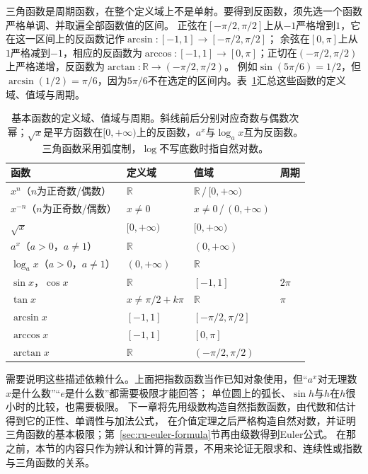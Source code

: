 三角函数是周期函数，在整个定义域上不是单射。要得到反函数，须先选一个函数严格单调、并取遍全部函数值的区间。
正弦在$[-\pi/2,\pi/2]$上从$-1$严格增到$1$，它在这一区间上的反函数记作$\arcsin:[-1,1]\to[-\pi/2,\pi/2]$；
余弦在$[0,\pi]$上从$1$严格减到$-1$，相应的反函数为$\arccos:[-1,1]\to[0,\pi]$；正切在$(-\pi/2,\pi/2)$上严格递增，反函数为$\arctan:\mathbb R\to(-\pi/2,\pi/2)$。
例如$\sin(5\pi/6)=1/2$，但$\arcsin(1/2)=\pi/6$，因为$5\pi/6$不在选定的区间内。表~\ref{tab:ru-elementary-functions}汇总这些函数的定义域、值域与周期。

\begin{table}[htbp]
 \centering\small
 \begin{tabular}{@{}llll@{}}
 \toprule
 函数 & 定义域 & 值域 & 周期\\
 \midrule
 $x^n$（$n$为正奇数/偶数） & $\mathbb R$ & $\mathbb R$\,/\,$[0,+\infty)$ & \\
 $x^{-n}$（$n$为正奇数/偶数） & $x\neq0$ & $x\neq0$\,/\,$(0,+\infty)$ & \\
 $\sqrt x$ & $[0,+\infty)$ & $[0,+\infty)$ & \\
 $a^x$（$a>0$，$a\neq1$） & $\mathbb R$ & $(0,+\infty)$ & \\
 $\log_ax$（$a>0$，$a\neq1$） & $(0,+\infty)$ & $\mathbb R$ & \\
 $\sin x$，$\cos x$ & $\mathbb R$ & $[-1,1]$ & $2\pi$\\
 $\tan x$ & $x\neq\pi/2+k\pi$ & $\mathbb R$ & $\pi$\\
 $\arcsin x$ & $[-1,1]$ & $[-\pi/2,\pi/2]$ & \\
 $\arccos x$ & $[-1,1]$ & $[0,\pi]$ & \\
 $\arctan x$ & $\mathbb R$ & $(-\pi/2,\pi/2)$ & \\
 \bottomrule
 \end{tabular}
 \caption{基本函数的定义域、值域与周期。斜线前后分别对应奇数与偶数次幂；$\sqrt x$是平方函数在$[0,+\infty)$上的反函数，$a^x$与$\log_ax$互为反函数。三角函数采用弧度制，$\log$不写底数时指自然对数。}
 \label{tab:ru-elementary-functions}
\end{table}

需要说明这些描述依赖什么。上面把指数函数当作已知对象使用，但“$a^x$对无理数$x$是什么数”“$e$是什么数”都需要极限才能回答；
单位圆上的弧长、$\sin h$与$h$在$h$很小时的比较，也需要极限。
下一章将先用级数构造自然指数函数，由代数和估计得到它的正性、单调性与加法公式，
在介值定理之后严格构造自然对数，并证明三角函数的基本极限；第~\ref{sec:ru-euler-formula}节再由级数得到Euler公式。
在那之前，本节的内容只作为辨认和计算的背景，不用来论证无限求和、连续性或指数与三角函数的关系。
